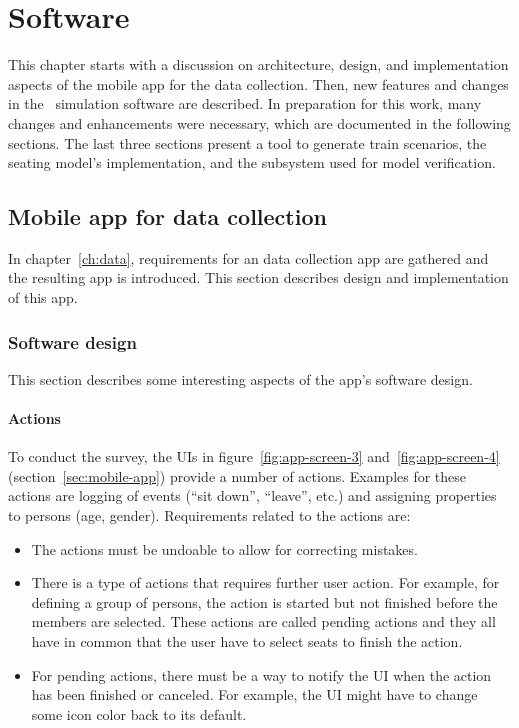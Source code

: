 \chapter{Software}
\label{ch:software}

This chapter starts with a discussion on architecture, design, and
implementation aspects of the mobile app for the data collection.
Then, new features and changes in the \vadere\ simulation
software are described.
In preparation for this work, many changes and enhancements were necessary,
which are documented in the following sections.
The last three sections present a tool to generate train scenarios, the seating
model's implementation, and the subsystem used for model verification.

\section{Mobile app for data collection}

In chapter~\ref{ch:data}, requirements for an data collection app are gathered and
the resulting app is introduced.
This section describes design and implementation of this app.

\subsection{Software design}

This section describes some interesting aspects of the app's software design.

\subsubsection{Actions}

To conduct the survey, the \acsp{UI} in figure~\ref{fig:app-screen-3}
and~\ref{fig:app-screen-4} (section~\ref{sec:mobile-app}) provide a number of actions.
Examples for these actions are logging of events (``sit down'', ``leave'',
etc.) and assigning properties to persons (age, gender).
Requirements related to the actions are:

\begin{itemize}

  \item The actions must be undoable to allow for correcting mistakes.

  \item There is a type of actions that requires further user action.
    For example, for defining a group of persons, the action is started but not
    finished before the members are selected.
    These actions are called pending actions and they all have in common that
    the user have to select seats to finish the action.

  \item For pending actions, there must be a way to notify the \acs{UI} when the
    action has been finished or canceled. For example, the \acs{UI} might have
    to change some icon color back to its default.

\end{itemize}

